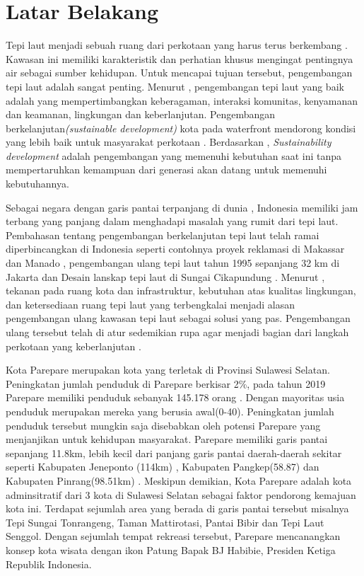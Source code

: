 \documentclass[12pt,oneside]{udthesis}\usepackage[]{graphicx}\usepackage[]{color}
\begin{document}
\section{Latar Belakang}
Tepi laut menjadi sebuah ruang dari perkotaan yang harus terus berkembang \cite{shamsuddin2013}. Kawasan ini memiliki karakteristik dan perhatian khusus mengingat pentingnya air sebagai sumber kehidupan. Untuk mencapai tujuan tersebut, pengembangan tepi laut adalah sangat penting. Menurut \cite{hussein2014}, pengembangan tepi laut yang baik adalah yang mempertimbangkan keberagaman, interaksi komunitas, kenyamanan dan keamanan, lingkungan dan keberlanjutan. Pengembangan berkelanjutan\textit{(sustainable development)} kota pada waterfront mendorong kondisi yang lebih baik untuk masyarakat perkotaan \citep{brebbia2016sustainable}.
Berdasarkan \cite{imperatives1987}, \textit{Sustainability development} adalah pengembangan yang memenuhi kebutuhan saat ini tanpa mempertaruhkan kemampuan dari generasi akan datang untuk memenuhi kebutuhannya.

Sebagai negara dengan garis pantai terpanjang di dunia \citep{hindersah2015}, Indonesia memiliki jam terbang yang panjang dalam menghadapi masalah yang rumit dari tepi laut. Pembahasan tentang pengembangan berkelanjutan tepi laut telah ramai diperbincangkan di Indonesia seperti contohnya proyek reklamasi di Makassar dan Manado \citep{andi2017,tungka2012, fhuh2017}, pengembangan ulang tepi laut tahun 1995 sepanjang 32 km di Jakarta \citep{pramesti2017} dan Desain lanskap tepi laut di Sungai Cikapundung \citep{ainy2016}. Menurut \cite{breen1994}, tekanan pada ruang kota dan infrastruktur, kebutuhan atas kualitas lingkungan, dan ketersediaan ruang tepi laut yang terbengkalai menjadi alasan pengembangan ulang kawasan tepi laut sebagai solusi yang pas. Pengembangan ulang tersebut telah di atur sedemikian rupa agar menjadi bagian dari langkah perkotaan yang keberlanjutan \citep{pramesti2017}.

Kota Parepare merupakan kota yang terletak di Provinsi Sulawesi Selatan. Peningkatan jumlah penduduk di Parepare berkisar 2\%, pada tahun 2019 Parepare memiliki penduduk sebanyak 145.178 orang \citep{bpskotaparepare2020}. Dengan mayoritas usia penduduk  merupakan mereka yang berusia awal(0-40). Peningkatan jumlah penduduk tersebut mungkin saja disebabkan oleh potensi Parepare yang menjanjikan untuk kehidupan masyarakat.
Parepare memiliki garis pantai sepanjang 11.8km, lebih kecil dari panjang garis pantai daerah-daerah sekitar seperti Kabupaten Jeneponto (114km) \citep{wardasusaniati2011}, Kabupaten Pangkep(58.87) dan Kabupaten Pinrang(98.51km) \citep{goni2018}. Meskipun demikian, Kota Parepare adalah kota adminsitratif dari 3 kota di Sulawesi Selatan \citep{junaid2016} sebagai faktor pendorong kemajuan kota ini.
Terdapat sejumlah area yang berada di garis pantai tersebut misalnya Tepi Sungai Tonrangeng, Taman Mattirotasi, Pantai Bibir dan Tepi Laut Senggol.
Dengan sejumlah tempat rekreasi tersebut, Parepare mencanangkan konsep kota wisata dengan ikon Patung Bapak BJ Habibie, Presiden Ketiga Republik Indonesia.
\end{document}
